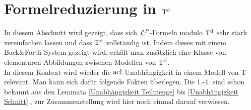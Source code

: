 \newpage

\section{Formelreduzierung in $\operatorname{T^d}$}
In diesem Abschnitt wird gezeigt, dass sich $\mathcal{L}^P$-Formeln modulo $\operatorname{T^d}$ sehr stark vereinfachen lassen und dass $\operatorname{T^d}$ vollständig ist. Indem dieses mit einem Back\&Forth-System gezeigt wird, erhält man zusätzlich eine Klasse von elementaren Abbildungen zwischen Modellen von $\operatorname{T^d}$.\\
In diesem Kontext wird wieder die $\operatorname{acl}$-Unabhängigkeit in einem Modell von T relevant. Man kann sich dafür folgende Fakten überlegen. Die 1.-4. sind schon bekannt aus den Lemmata \ref{Unabhängigkeit Teilmenge} bis \ref{Unabhängigkeit Schnitt}., zur Zusammenstellung wird hier noch einmal darauf verwiesen.

